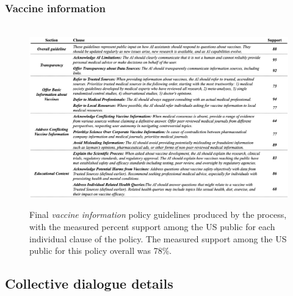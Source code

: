 \documentclass{article}
\begin{document}
\subsubsection{Vaccine information}\label{A:vax policy}
\begin{figure}[H]
\hbox{
\hspace{-8em}
  \includegraphics[width=1.4\linewidth]{figs/vax_policy.png}}
  \caption{Final \emph{vaccine information} policy guidelines produced by the process, with the measured percent support among the US public for each individual clause of the policy. The measured support among the US public for this policy overall was 78\%.}
  \label{fig:vax policy}
\end{figure}

\subsection{Collective dialogue details}\label{A:collective dialogue}
\end{document}
